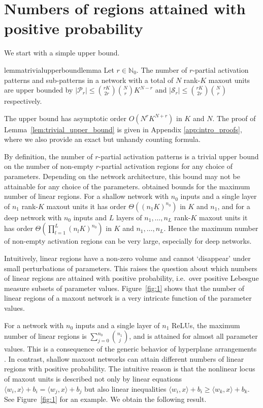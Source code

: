 \documentclass{article}
\theoremstyle{definition}
\begin{document}
\section{Numbers of regions attained with positive probability}
\label{sec:numbers}

We start with a simple upper bound. 
\begin{restatable}{lemma}{trivialupperboundlemma}
    \label{lem:trivial_upper_bound}
    Let $r\in\mathbb{N}_0$. The number of $r$-partial activation patterns and sub-patterns in a network with a total of $N$ rank-$K$ maxout units are upper bounded by $|\mathcal{P}_r| \leq \binom{r K}{2r} \binom{N}{r} K^{N - r}$ and $|\mathcal{S}_r|\leq \binom{r K}{2r} \binom{N}{r}$ respectively. 
\end{restatable}
The upper bound has asymptotic order $O(N^r K^{N+r})$ in $K$ and $N$. 
The proof of Lemma~\ref{lem:trivial_upper_bound} is given in Appendix \ref{app:intro_proofs}, where we also provide an exact but unhandy counting formula.

By definition, the number of $r$-partial activation patterns is a trivial upper bound on the number of non-empty $r$-partial activation regions for any choice of parameters.
Depending on the network architecture, this bound may not be attainable for any choice of the parameters.
\citet[Theorems~3.7 and 3.12]{sharp2021} obtained bounds for the maximum number of linear regions. For a shallow network with $n_0$ inputs and a single layer of $n_1$ rank-$K$ maxout units it has order $\Theta((n_1 K)^{n_0})$ in $K$ and $n_1$, and for a deep network with $n_0$ inputs and $L$ layers of $n_1,\ldots, n_L$ rank-$K$ maxout units it has order $\Theta(\prod_{l=1}^L(n_l K)^{n_0})$ in $K$ and $n_1,\ldots, n_L$.
Hence the maximum number of non-empty activation regions can be very large, especially for deep networks. 

Intuitively, linear regions have a non-zero volume and cannot `disappear' under small perturbations of parameters.
This raises the question about which numbers of linear regions are attained with positive probability, i.e.\ over positive Lebesgue measure subsets of parameter values. Figure~\ref{fig:1} shows that the number of linear regions of a maxout network is a very intricate function of the parameter values. 

For a network with $n_0$ inputs and a single layer of $n_1$ ReLUs, the maximum number of linear regions is $\sum_{j=0}^{n_0}\binom{n_1}{j}$, and is attained for almost all parameter values. This is a consequence of the generic behavior of hyperplane arrangements \citep[see][]{10.2307/2303424,zaslavsky1975facing,NIPS2014_5422}. 
In contrast, shallow maxout networks can attain different numbers of linear regions with positive probability. The intuitive reason is that the nonlinear locus of maxout units is described not only by linear equations $\langle w_i, x\rangle + b_i = \langle w_j, x\rangle +b_j$ but also linear inequalities $\langle w_i, x\rangle + b_i \geq \langle w_k, x\rangle +b_k$. See Figure~\ref{fig:1} for an example. 
We obtain the following result. 
\end{document}

